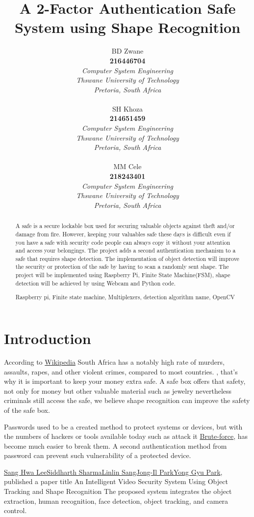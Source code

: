 \documentclass[10pt,sigconf, review]{article}
\title{ \huge A 2-Factor Authentication Safe System using Shape Recognition}
\author{BD Zwane \\
  \textbf{216446704}\\
  \em{Computer System Engineering}\\
  \em{Thswane University of Technology}\\
  \em{Pretoria, South Africa}\\

  \And

  SH Khoza \\
  \textbf{214651459}\\
  \em{Computer System Engineering}\\
  \em{Thswane University of Technology}\\
  \em{Pretoria, South Africa}\\

  \And 

  MM Cele \\
  \textbf{218243401}\\
  \em{Computer System Engineering}\\
  \em{Thswane University of Technology}\\
  \em{Pretoria, South Africa}\\}
\date{}
\begin{document}
\maketitle

\begin{abstract}

A safe is a secure lockable box used for securing valuable objects against
theft and/or damage from fire. However, keeping your valuables safe these days
is difficult even if you have a safe with security code people can always copy
it without your attention and access your belongings. The project adds a second
authentication mechanism to a safe that requires shape detection. The
implementation of object detection will improve the security or protection of
the safe by having to scan a randomly sent shape. The project will be
implemented using Raspberry Pi, Finite State Machine(FSM), shape detection will
be achieved by using Webcam and Python code.

Raspberry pi, Finite state machine, Multiplexers, detection algorithm
name, OpenCV

\end{abstract}

\section{Introduction}
 
According to \href{https://en.wikipedia.org/wiki/Crime_in_South_Africa}
{\color{blue}Wikipedia} South Africa has a notably high rate of murders,
assaults, rapes, and other violent crimes, compared to most countries. , that's why it is important to keep your money
extra safe. A safe box offers that safety, not only for money but other valuable
material such as jewelry nevertheless criminals still access the safe, we
believe shape recognition can improve the safety of the safe box.

Passwords used to be a created method to protect systems or devices, but with
the numbers of hackers or tools available today such as  attack it
\href{Brute-force} {\color{blue}Brute-force}, has become much easier to break
them. A second authentication method from password can prevent such
vulnerability of a protected device.
  
\href{https://link.springer.com/chapter/10.1007/978-3-642-23687-7_43}
{\color{blue}Sang Hwa LeeSiddharth SharmaLinlin SangJong-Il ParkYong Gyu Park},
published a paper title An Intelligent Video Security System Using Object Tracking and
Shape Recognition The proposed system integrates the object extraction, human
recognition, face detection, object tracking, and camera control.
\end{document}

